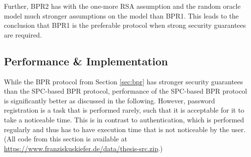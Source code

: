 Further, BPR2 has with the one-more RSA assumption and the random oracle model much stronger assumptions on the model than BPR1.
This leads to the conclusion that BPR1 is the preferable protocol when strong security guarantees are required.

\subsection{Performance \& Implementation} \label{sec:performance}

While the \ac{BPR} protocol from Section \ref{sec:bpr} has stronger security guarantees than the \ac{SPC}-based \ac{BPR} protocol, performance of the \ac{SPC}-based \ac{BPR} protocol is significantly better as discussed in the following.
However, password registration is a task that is performed rarely, such that it is acceptable for it to take a noticeable time. 
This is in contrast to authentication, which is performed regularly and thus has to have execution time that is not noticeable by the user.
(All code from this section is available at \url{https://www.franziskuskiefer.de/data/thesis-src.zip}.)

